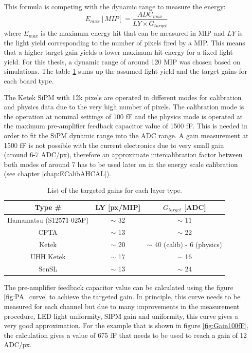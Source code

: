 This formula is competing with the dynamic range to measure the energy:
\begin{equation}
  E_{max} [MIP] = \frac{ADC_{max}}{LY \times G_{target}}
\end{equation}
where $E_{max}$ is the maximum energy hit that can be measured in MIP and $LY$ is the light yield corresponding to the number of pixels fired by a MIP. This means that a higher target gain yields a lower maximum hit energy for a fixed light yield. For this thesis, a dynamic range of around 120 MIP was chosen based on simulations. The table \ref{table:GainTarget_SiPM} sums up the assumed light yield and the target gains for each board type.

The Ketek SiPM with 12k pixels are operated in different modes for calibration and physics data due to the very high number of pixels. The calibration mode is the operation at nominal settings of 100 fF and the physics mode is operated at the maximum pre-amplifier feedback capacitor value of 1500 fF. This is needed in order to fit the SiPM dynamic range into the ADC range. A gain measurement at 1500 fF is not possible with the current electronics due to very small gain (around 6-7 ADC/px), therefore an approximate intercalibration factor between both modes of around 7 has to be used later on in the energy scale calibration (see chapter \ref{chap:ECalibAHCAL}).

\begin{table}[htb!]
  \centering
  \caption{List of the targeted gains for each layer type.}
  \label{table:GainTarget_SiPM}
  \begin{tabular}{@{} ccc @{}}
    \toprule
    Type \# & LY [px/MIP] & $G_{target}$ [ADC] \\
    \midrule
    Hamamatsu (S12571-025P) & $\sim$ 32 & $\sim$ 11\\
    CPTA & $\sim$ 13 & $\sim$ 22\\
    Ketek & $\sim$ 20 & $\sim$ 40 (calib) - 6 (physics)\\
    UHH Ketek & $\sim$ 17 & $\sim$ 16\\
    SenSL & $\sim$ 13 & $\sim$ 24\\
    \bottomrule
  \end{tabular}
\end{table}

The pre-amplifier feedback capacitor value can be calculated using the figure \ref{fig:PA_curve} to achieve the targeted gain. In principle, this curve needs to be measured for each channel but due to many improvements in the measurement procedure, LED light uniformity, SIPM gain and uniformity, this curve gives a very good approximation. For the example that is shown in figure \ref{fig:Gain100fF}, the calculation gives a value of 675 fF that needs to be used to reach a gain of 12 ADC/px.

